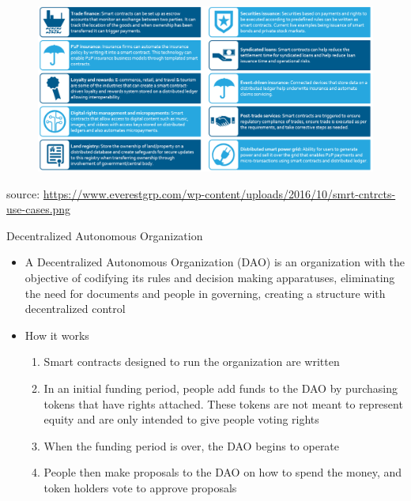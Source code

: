 \documentclass[9pt]{beamer}
\begin{document}

\begin{frame}{}
	\begin{figure}[]
		\centering
		\includegraphics  [scale=0.4]{Images/smart-use}
	\end{figure}
	\begin{scriptsize}
		source: \href{https://www.everestgrp.com/2016-10-smart-contracts-use-cases-market-insights-36265.html/}{https://www.everestgrp.com/wp-content/uploads/2016/10/smrt-cntrcts-use-cases.png}
	\end{scriptsize}
\end{frame}


\begin{frame}{Decentralized Autonomous Organization}
	\begin{itemize}
		\item A Decentralized Autonomous Organization (DAO) is an organization with the objective of codifying its rules and decision making apparatuses, eliminating the need for documents and people in governing, creating a structure with decentralized control
		\item How it works
		\begin{enumerate}
			\item Smart contracts designed to run the organization are written
			\item In an initial funding period, people add funds to the DAO by purchasing tokens that have rights attached. These tokens are not meant to represent equity and are only intended to give people voting rights
			\item When the funding period is over, the DAO begins to operate
			\item People then  make proposals to the DAO on how to spend the money, and token holders vote to approve proposals
		\end{enumerate}
	\end{itemize}
\end{frame}
\end{document}
